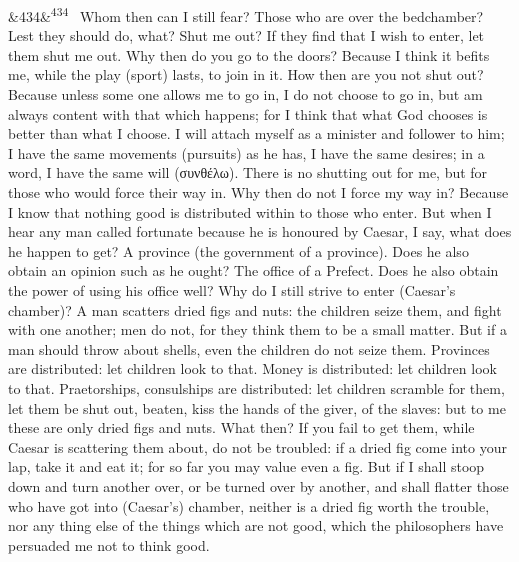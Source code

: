 \documentclass[12pt]{article}
\newcommand{\para}[1][]{\par\noindent\ifx&#1&\else\textsuperscript{\footnotesize #1}~\fi}
\begin{document}
\para[434] Whom then can I still fear? Those who are over the bedchamber? Lest they should do, what? Shut me out? If they find that I wish to enter, let them shut me out. Why then do you go to the doors? Because I think it befits me, while the play (sport) lasts, to join in it. How then are you not shut out? Because unless some one allows me to go in, I do not choose to go in, but am always content with that which happens; for I think that what God chooses is better than what I choose. I will attach myself as a minister and follower to him; I have the same movements (pursuits) as he has, I have the same desires; in a word, I have the same will (συνθέλω). There is no shutting out for me, but for those who would force their way in. Why then do not I force my way in? Because I know that nothing good is distributed within to those who enter. But when I hear any man called fortunate because he is honoured by Caesar, I say, what does he happen to get? A province (the government of a province). Does he also obtain an opinion such as he ought? The office of a Prefect. Does he also obtain the power of using his office well? Why do I still strive to enter (Caesar's chamber)? A man scatters dried figs and nuts: the children seize them, and fight with one another; men do not, for they think them to be a small matter. But if a man should throw about shells, even the children do not seize them. Provinces are distributed: let children look to that. Money is distributed: let children look to that. Praetorships, consulships are distributed: let children scramble for them, let them be shut out, beaten, kiss the hands of the giver, of the slaves: but to me these are only dried figs and nuts. What then? If you fail to get them, while Caesar is scattering them about, do not be troubled: if a dried fig come into your lap, take it and eat it; for so far you may value even a fig. But if I shall stoop down and turn another over, or be turned over by another, and shall flatter those who have got into (Caesar's) chamber, neither is a dried fig worth the trouble, nor any thing else of the things which are not good, which the philosophers have persuaded me not to think good.
\end{document}
